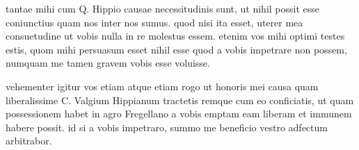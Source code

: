 


 tantae mihi cum Q. Hippio causae necessitudinis sunt, ut nihil possit esse coniunctius quam nos inter nos sumus. quod nisi ita esset, uterer mea consuetudine ut vobis nulla in re molestus essem. etenim vos mihi optimi testes estis, quom mihi persuasum esset nihil esse quod a vobis impetrare non possem, numquam me tamen gravem vobis esse voluisse.

 vehementer igitur vos etiam atque etiam rogo ut honoris mei causa quam liberalissime C. Valgium Hippianum tractetis remque cum eo conficiatis, ut quam possessionem habet in agro Fregellano a vobis emptam eam liberam et immunem habere possit. id si a vobis impetraro, summo me beneficio vestro adfectum arbitrabor.

